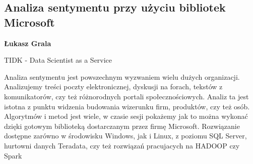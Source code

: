 \documentclass[\main/boa.tex]{subfiles}
\begin{document}
\subsection{Analiza sentymentu przy użyciu bibliotek Microsoft}

\begin{minipage}{0.915\textwidth}
	\centering
  {\bf {} Łukasz Grala}
\end{minipage}

\vskip 0.3cm

\begin{affiliations}
\begin{minipage}{0.915\textwidth}
\centering
TIDK - Data Scientist as a Service  \\[-2pt]
\end{minipage}
\end{affiliations}

\vskip 0.8cm

Analiza sentymentu jest powszechnym wyzwaniem wielu dużych organizacji. Analizujemy treści poczty elektronicznej, dyskusji na forach, tekstów z komunikatorów, czy też różnorodnych portali społecznościowych. Analiz ta jest istotna z punktu widzenia budowania wizerunku firm, produktów, czy też osób. Algorytmów i metod jest wiele, w czasie sesji pokażemy jak to można wykonać dzięki gotowym biblioteką dostarczanym przez firmę Microsoft. Rozwiązanie dostępne zarówno w środowisku Windows, jak i Linux, z poziomu SQL Server, hurtowni danych Teradata, czy też rozwiązań pracujacych na HADOOP czy Spark
\end{document}
